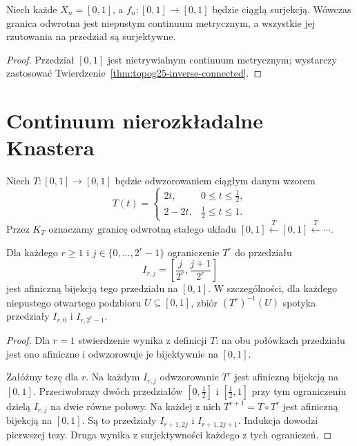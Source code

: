 \begin{stwierdzenie}
\label{prop:topog25-inverse-intervals}
Niech każde \(X_n=[0,1]\),
a \(f_n\colon[0,1]\to[0,1]\)
będzie ciągłą surjekcją.
Wówczas granica odwrotna
jest niepustym continuum metrycznym,
a wszystkie jej rzutowania
na przedział są surjektywne.
\end{stwierdzenie}
\begin{proof}
Przedział \([0,1]\)
jest nietrywialnym continuum
metrycznym; wystarczy zastosować
Twierdzenie~\ref{thm:topog25-inverse-connected}.
\end{proof}

\section{Continuum nierozkładalne Knastera}
\label{sec:topog25-knaster}

\begin{definicja}
\label{def:topog25-tent}
Niech \(T\colon[0,1]\to[0,1]\)
będzie odwzorowaniem ciągłym danym wzorem
\[
 T(t)=
 \begin{cases}
  2t,&0\le t\le\tfrac12,\\
  2-2t,&\tfrac12\le t\le1.
 \end{cases}
\]
Przez \(K_T\) oznaczamy granicę
odwrotną stałego układu
\([0,1]\xleftarrow{T}[0,1]
\xleftarrow{T}\cdots\).
\end{definicja}

\begin{lemat}
\label{lem:topog25-tent-branches}
Dla każdego \(r\ge1\) i
\(j\in\{0,\ldots,2^r-1\}\)
ograniczenie \(T^r\) do przedziału
\[
 I_{r,j}=\left[\frac{j}{2^r},
                     \frac{j+1}{2^r}\right]
\]
jest afiniczną bijekcją tego
przedziału na \([0,1]\).
W szczególności, dla każdego
niepustego otwartego podzbioru
\(U\subseteq[0,1]\), zbiór
\((T^r)^{-1}(U)\) spotyka
przedziały \(I_{r,0}\) i
\(I_{r,2^r-1}\).
\end{lemat}
\begin{proof}
Dla \(r=1\) stwierdzenie
wynika z definicji \(T\):
na obu połówkach przedziału
jest ono afiniczne i odwzorowuje
je bijektywnie na \([0,1]\).

Załóżmy tezę dla \(r\).
Na każdym \(I_{r,j}\)
odwzorowanie \(T^r\) jest
afiniczną bijekcją na \([0,1]\).
Przeciwobrazy dwóch przedziałów
\([0,\tfrac12]\) i
\([\tfrac12,1]\)
przy tym ograniczeniu dzielą
\(I_{r,j}\) na dwie równe połowy.
Na każdej z nich \(T^{r+1}=T\circ T^r\)
jest afiniczną bijekcją na \([0,1]\).
Są to przedziały
\(I_{r+1,2j}\) i \(I_{r+1,2j+1}\).
Indukcja dowodzi pierwszej tezy.
Druga wynika z surjektywności
każdego z tych ograniczeń.
\end{proof}

